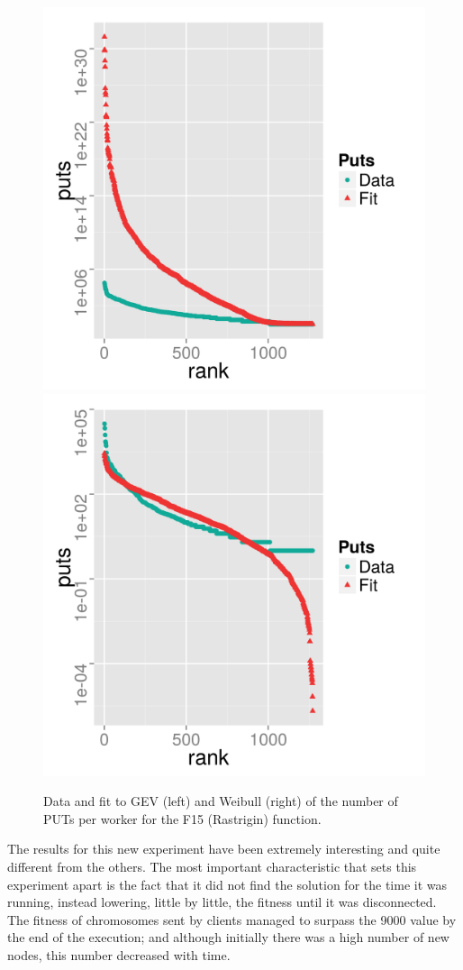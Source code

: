 \documentclass{sig-alternate}
\begin{document}
\begin{figure}[!htb]
\centering
\includegraphics[width=0.49\linewidth]{gev-fit-ww-rastrigin-workers.png}
\includegraphics[width=0.49\linewidth]{weibull-fit-ww-rastrigin-workers.png}
\caption{Data and fit to GEV (left) and Weibull (right) of the number
  of PUTs per worker for the F15 (Rastrigin) function.}  
\label{fig:fit:rastrigin}
\end{figure}
%

The results for this new experiment have been extremely interesting
and quite different from the others. The most important
characteristic that sets this experiment apart is
the fact that it did not find the solution for the time it was
running, instead lowering, little by little, the fitness until it was
disconnected. The fitness of chromosomes sent by clients managed to
surpass the 9000 value by the end of the execution; and although initially there
was a high number of new nodes, this number decreased with time.
\end{document}
